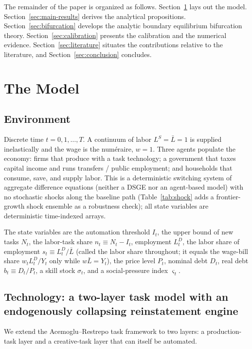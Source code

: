 \documentclass[review,12pt]{elsarticle}
\theoremstyle{plain}
\theoremstyle{definition}
\theoremstyle{remark}
\newcommand{\barL}{\bar{L}}
\begin{document}
The remainder of the paper is organized as follows. Section~\ref{sec:model} lays out the model. Section~\ref{sec:main-results} derives the analytical propositions. Section~\ref{sec:bifurcation} develops the analytic boundary equilibrium bifurcation theory. Section~\ref{sec:calibration} presents the calibration and the numerical evidence. Section~\ref{sec:literature} situates the contributions relative to the literature, and Section~\ref{sec:conclusion} concludes.

\section{The Model}
\label{sec:model}

\subsection{Environment}
Discrete time $t=0,1,\dots,T$. A continuum of labor $L^S=\barL=1$ is supplied inelastically and the wage is the num\'eraire, $w=1$. Three agents populate the economy: firms that produce with a task technology; a government that taxes capital income and runs transfers / public employment; and households that consume, save, and supply labor. This is a deterministic switching system of aggregate difference equations (neither a DSGE nor an agent-based model) with no stochastic shocks along the baseline path (Table~\ref{tab:shock} adds a frontier-growth shock ensemble as a robustness check); all state variables are deterministic time-indexed arrays.

The state variables are the automation threshold $I_t$, the upper bound of new tasks $N_t$, the labor-task share $n_t\equiv N_t-I_t$, employment $L_t^D$, the labor share of employment $s_t\equiv L_t^D/\barL$ (called the labor share throughout; it equals the wage-bill share $w_tL_t^D/Y_t$ only while $w\barL=Y_t$), the price level $P_t$, nominal debt $D_t$, real debt $b_t\equiv D_t/P_t$, a skill stock $\sigma_t$, and a social-pressure index $\varsigma_t$.

\subsection{Technology: a two-layer task model with an endogenously collapsing reinstatement engine}
\label{sec:technology}
We extend the Acemoglu--Restrepo task framework to two layers: a production-task layer and a creative-task layer that can itself be automated.
\end{document}
